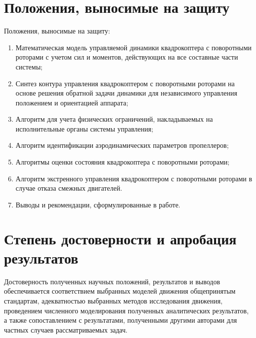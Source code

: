 \section{Положения, выносимые на защиту}
Положения, выносимые на защиту:
\begin{enumerate}
\item Математическая модель управляемой динамики квадрокоптера с поворотными роторами с учетом сил и моментов, действующих на все составные части системы;
\item Синтез контура управления квадрокоптером с поворотными роторами на основе решения обратной задачи динамики для независимого управления положением и ориентацией аппарата; 
\item Алгоритм для учета физических ограничений, накладываемых на исполнительные органы системы управления;
\item Алгоритм идентификации аэродинамических параметров пропеллеров;
\item Алгоритмы оценки состояния квадрокоптера с поворотными роторами;
\item Алгоритм экстренного управления квадрокоптером с поворотными роторами в случае отказа смежных двигателей.
\item Выводы и рекомендации, сформулированные в работе.
\end{enumerate}

\section{Степень достоверности и апробация результатов}
Достоверность полученных научных положений, результатов и выводов обеспечивается
соответствием выбранных моделей движения общепринятым стандартам,
адекватностью выбранных методов исследования движения,
проведением численного моделирования полученных аналитических результатов,
а также сопоставлением с результатами,
полученными другими авторами для частных случаев рассматриваемых задач.

